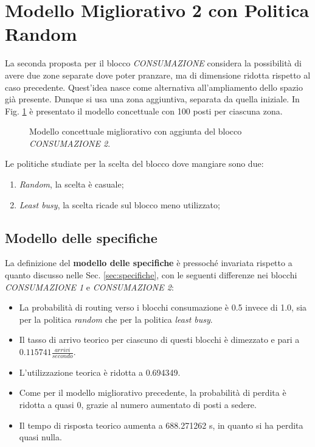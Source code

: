 \documentclass{article}
\begin{document}
\section{Modello Migliorativo 2 con Politica Random}\label{sec:migliorativo_2_random}

La seconda proposta per il blocco \textit{CONSUMAZIONE} considera la possibilità di avere due zone separate dove poter pranzare, ma di dimensione ridotta rispetto al caso precedente. Quest'idea nasce come alternativa all'ampliamento dello spazio già presente. Dunque si usa una zona aggiuntiva, separata da quella iniziale.
In Fig. \ref{fig:esteso_2_concettuale} è presentato il modello concettuale con 100 posti per ciascuna zona.

\begin{figure}[H]
\centering
 
  \caption{Modello concettuale migliorativo con aggiunta del blocco \textit{CONSUMAZIONE 2}.}
  \label{fig:esteso_2_concettuale}
\end{figure}
Le politiche studiate per la scelta del blocco dove mangiare sono due: 
\begin{enumerate}
    \item \textit{Random}, la scelta è casuale;
    \item \textit{Least busy}, la scelta ricade sul blocco meno utilizzato;  
\end{enumerate}

\subsection{Modello delle specifiche}

La definizione del \textbf{modello delle specifiche} è pressoché invariata rispetto a quanto discusso nelle Sec. \ref{sec:specifiche}, con le seguenti differenze nei blocchi \textit{CONSUMAZIONE 1} e \textit{CONSUMAZIONE 2}:
\begin{itemize}
\item La probabilità di routing verso i blocchi consumazione è 0.5 invece di 1.0, sia per la politica \textit{random} che per la politica \textit{least busy}.
\item Il tasso di arrivo teorico per ciascuno di questi blocchi è dimezzato e pari a $0.115741 \frac{arrivi}{secondo}$.
\item L'utilizzazione teorica è ridotta a 0.694349.
\item Come per il modello migliorativo precedente, la probabilità di perdita è ridotta a quasi 0, grazie al numero aumentato di posti a sedere.
\item Il tempo di risposta teorico aumenta a 688.271262 s, in quanto si ha perdita quasi nulla.
\end{itemize}
\end{document}

